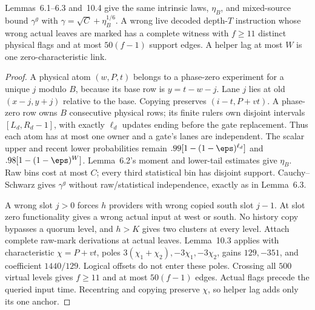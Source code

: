 \begin{lemma}\label{lem:three-sensors}
Lemmas~6.1--6.3 and~10.4 give the same intrinsic laws, $\eta_B$, and mixed-source bound $\gamma^g$ with $\gamma=\sqrt C+\eta_B^{1/6}$. A wrong live decoded depth-$T$ instruction whose wrong actual leaves are marked has a complete witness with $f\ge11$ distinct physical flags and at most $50(f-1)$ support edges. A helper lag at most $W$ is one zero-characteristic link.
\end{lemma}
\begin{proof}
A physical atom $(w,P,t)$ belongs to a phase-zero experiment for a unique $j$ modulo $B$, because its base row is $y=t-w-j$. Lane $j$ lies at old $(x-j,y+j)$ relative to the base. Copying preserves $(i-t,P+vt)$. A phase-zero row owns $B$ consecutive physical rows; its finite rulers own disjoint intervals $[L_d,R_d-1]$, with exactly $\ell_d$ updates ending before the gate replacement. Thus each atom has at most one owner and a gate's lanes are independent. The scalar upper and recent lower probabilities remain $.99[1-(1-\eps)^{\ell_d}]$ and $.98[1-(1-\eps)^W]$. Lemma~6.2's moment and lower-tail estimates give $\eta_B$. Raw bins cost at most $C$; every third statistical bin has disjoint support. Cauchy--Schwarz gives $\gamma^g$ without raw/statistical independence, exactly as in Lemma~6.3.

A wrong slot $j>0$ forces $h$ providers with wrong copied south slot $j-1$. At slot zero functionality gives a wrong actual input at west or south. No history copy bypasses a quorum level, and $h>K$ gives two clusters at every level. Attach complete raw-mark derivations at actual leaves. Lemma~10.3 applies with characteristic $\chi=P+vt$, poles $3(\chi_1+\chi_2),-3\chi_1,-3\chi_2$, gains $129,-351$, and coefficient $1440/129$. Logical offsets do not enter these poles. Crossing all $500$ virtual levels gives $f\ge11$ and at most $50(f-1)$ edges. Actual flags precede the queried input time. Recentring and copying preserve $\chi$, so helper lag adds only its one anchor.
\end{proof}

